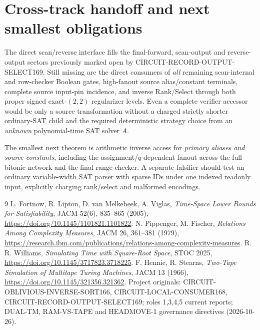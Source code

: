 \documentclass[11pt]{article}
\begin{document}
\section{Cross-track handoff and next smallest obligations}
The direct scan/reverse interface fills the final-forward,
scan-output and reverse-output sectors previously marked open
by CIRCUIT-RECORD-OUTPUT-SELECT169. Still missing are the direct
consumers of \emph{all} remaining scan-internal and row-checker
Boolean gates, high-fanout source alias/constant terminals,
complete source input-pin incidence, and inverse Rank/Select
through both proper signed exact-$(2,2)$ regularizer levels.
Even a complete verifier accessor would be only a source
transformation without a charged strictly shorter ordinary-SAT
child and the required deterministic strategy choice from an
\emph{unknown} polynomial-time SAT solver $A$.

The smallest next theorem is arithmetic inverse access for
\emph{primary aliases and source constants}, including the
assignment/$q$-dependent fanout across the full bitonic
network and the final range-checker. A separate falsifier
should test an ordinary variable-width SAT parser with sparse
IDs under one indexed readonly input, explicitly charging
rank/select and malformed encodings.

\begin{thebibliography}{9}
 L. Fortnow, R. Lipton, D. van Melkebeek, A. Viglas,
\emph{Time-Space Lower Bounds for Satisfiability},
JACM 52(6), 835--865 (2005),
\url{https://doi.org/10.1145/1101821.1101822}.
 N. Pippenger, M. Fischer,
\emph{Relations Among Complexity Measures}, JACM 26, 361--381
(1979), \url{https://research.ibm.com/publications/relations-among-complexity-measures}.
 R. R. Williams,
\emph{Simulating Time with Square-Root Space}, STOC 2025,
\url{https://doi.org/10.1145/3717823.3718225}.
 F. Hennie, R. Stearns,
\emph{Two-Tape Simulation of Multitape Turing Machines},
JACM 13 (1966), \url{https://doi.org/10.1145/321356.321362}.
 Project originals: CIRCUIT-OBLIVIOUS-INVERSE-SORT166,
CIRCUIT-LOCAL-CONSUMER168, CIRCUIT-RECORD-OUTPUT-SELECT169;
roles 1,3,4,5 current reports; DUAL-TM, RAM-VS-TAPE and
HEADMOVE-1 governance directives (2026-10-26).
\end{thebibliography}
\end{document}
